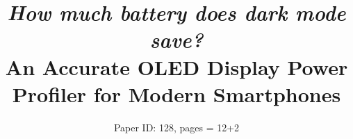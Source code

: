 \documentclass[]{sig-alternate-10pt}
\begin{document}
\title{
  {\it \LARGE How much battery does dark mode save?}\\
    An Accurate OLED Display Power Profiler
    for Modern Smartphones}



\author{
Paper ID: 128, pages = 12+2
} 


\newcommand{\oldstuff}[1]{}
\newcommand{\yes}{$\checkmark$}
\newcommand{\limited}{Limited}
\newcommand{\no}{$\times$}
\newcommand{\etc}{\emph{etc.}\xspace}
\newcommand{\etcc}{\emph{etc.}}
\newcommand{\ie}{\emph{i.e.,}\xspace}
\newcommand{\eg}{\emph{e.g.,}\xspace}
\newcommand{\etal}{\emph{et al.}\xspace}
\newcommand{\SmallCrunch}{\vspace{-0cm}}
\newcommand{\smallcrunch}{\vspace{-0cm}}

\renewcommand{\paragraph}[1]{\smallskip\noindent{\bf{#1}}}


\newcommand{\questionaj}[1]{{\color{red} \textbf{questionAJ: #1}}}
\newcommand{\updated}[1]{{\color{red} {}}}
\newcommand{\editaj}[2]{{\sout{#1}\color{red} {#2}}}
\newcommand{\removeaj}[2]{{\color{red}{\textbf{Remove following:}}}{\sout{#1}}	{\color{red} {\textbf{Because} #2}}}
\newcommand{\addaj}[1]{{\color{red} {ADD?: #1}}}

\newcommand{\insitu}{{\em in situ}\xspace}

\newcommand{\name}{{\sc PFOP}\xspace}
\newcommand{\namee}{{\sc PFOP}}
\newcommand{\ychurm}[1]{{\hspace{-0.2cm}}}

\newcommand{\panic}[1]{\vspace{-#1 plus 1pt minus 1pt}}
\newcommand{\panictwo}[1]{\vspace{-#1 plus 2pt minus 2pt}}

\newcommand{\appwithlink}[0]{\name~\cite{PFOP}~}
\end{document}
